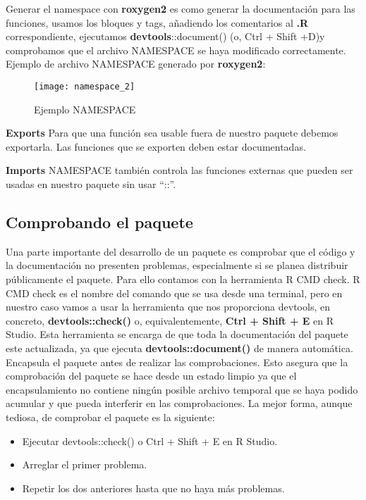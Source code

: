Generar el namespace con \textbf{roxygen2} es como generar la documentaci\'on para las funciones,
usamos los bloques y tags, a\~nadiendo los comentarios al \textbf{.R} correspondiente, ejecutamos
\textbf{devtools}::document() (o, Ctrl + Shift +D)y comprobamos que el archivo NAMESPACE se
haya modificado correctamente.
Ejemplo de archivo NAMESPACE generado por \textbf{roxygen2}:

\begin{figure}[H]
    \centering
    \texttt{[image: namespace\_2]}
    \caption{Ejemplo NAMESPACE }
    \label{fig:namespace}
\end{figure} 

\textbf{Exports}
Para que una funci\'on sea usable fuera de nuestro paquete debemos exportarla. Las funciones que se exporten deben estar documentadas.

\textbf{Imports}
NAMESPACE tambi\'en controla las funciones externas que pueden ser usadas en nuestro
paquete sin usar “::”.

\subsection{Comprobando el paquete}

Una parte importante del desarrollo de un paquete es comprobar que el c\'odigo y la
documentaci\'on no presenten problemas, especialmente si se planea distribuir p\'ublicamente
el paquete. Para ello contamos con la herramienta R CMD check.
R CMD check es el nombre del comando que se usa desde una terminal, pero en nuestro
caso vamos a usar la herramienta que nos proporciona devtools, en concreto,
\textbf{devtools::check()} o, equivalentemente, \textbf{Ctrl + Shift + E} en R Studio.
Esta herramienta se encarga de que toda la documentaci\'on del paquete este actualizada, ya
que ejecuta \textbf{devtools::document()} de manera autom\'atica.
Encapsula el paquete antes de realizar las comprobaciones. Esto asegura que la
comprobaci\'on del paquete se hace desde un estado limpio ya que el encapsulamiento no
contiene ning\'un posible archivo temporal que se haya podido acumular y que pueda interferir
en las comprobaciones.
La mejor forma, aunque tediosa, de comprobar el paquete es la siguiente:

\begin{itemize}
    \item Ejecutar devtools::check() o Ctrl + Shift + E en R Studio.
    \item Arreglar el primer problema.
    \item Repetir los dos anteriores hasta que no haya m\'as problemas.
\end{itemize}

